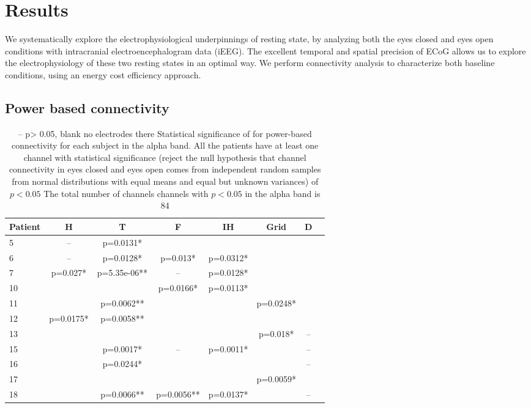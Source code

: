 \documentclass[11pt, onecolumn]{article}
\begin{document}
\section*{Results}
We systematically explore the electrophysiological underpinnings of resting state, by analyzing both the eyes closed and eyes open conditions with intracranial electroencephalogram data (iEEG).
The excellent temporal and spatial precision of ECoG allows us to explore the electrophysiology of these two resting states in an optimal way. 
We perform connectivity analysis to characterize both baseline conditions, using an energy cost efficiency approach. 


\subsection{Power based connectivity}
\begin{table}
\centering
\begin{tabular}{l*{6}{c}r}
Patient & H & T & F & IH & Grid & D  \\
\hline
5 & -- & p=0.0131* &  & &  &  \\ %
6 & -- & p=0.0128* & p=0.013* & p=0.0312* &  & \\ %
7 &  p=0.027*  &  p=5.35e-06**  & -- &  p=0.0128* & & \\
10 &  &  &  p=0.0166*  &   p=0.0113* &  &  \\
11 &  &  p=0.0062** &  &  &   p=0.0248*\\
12 &  p=0.0175* &  p=0.0058** &  &  & & \\ %
13 &  &  &  &  &  p=0.018* & -- \\%
15 &  &   p=0.0017* & -- &  p=0.0011* &  & --\\
16 &  &  p=0.0244* &  &  &  & -- \\
17 &  &  &  &  &   p=0.0059* & \\ %
18 &  &  p=0.0066** &  p=0.0056** &  p=0.0137* &  & --  \\
\end{tabular}
\caption{\label{Table:powconnect} 
-- p> 0.05, blank no electrodes there
Statistical significance of for power-based connectivity for each subject in the alpha band.
All the patients have at least one channel with statistical significance (reject the null hypothesis that channel connectivity in eyes closed and eyes open comes from independent random samples from normal distributions with equal means and equal but unknown variances) of  $p<0.05$ 
The total number of channels channels with $p<0.05$ in the alpha band is 84
}
\end{table}
\end{document}
